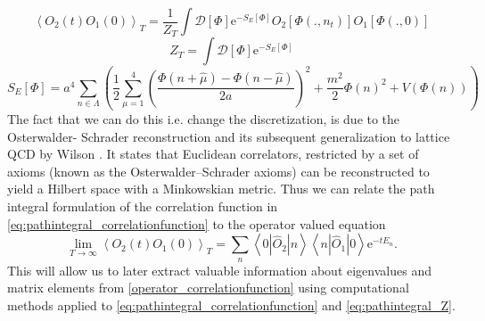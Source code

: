 \documentclass[a4paper,10pt]{book}
\begin{document}
\begin{equation}\label{eq:pathintegral_correlationfunction}
\left\langle O_{2}(t) O_{1}(0)\right\rangle_{T}=\frac{1}{Z_{T}} \int \mathcal{D}[\Phi] \mathrm{e}^{-S_{E}[\Phi]} O_{2}\left[\Phi\left(., n_{t}\right)\right] O_{1}[\Phi(., 0)]
\end{equation}
\begin{equation}\label{eq:pathintegral_Z}
Z_{T}=\int \mathcal{D}[\Phi] \mathrm{e}^{-S_{E}[\Phi]}
\end{equation}
\begin{equation}
S_{E}[\Phi]=a^{4} \sum_{n \in \Lambda}\left(\frac{1}{2} \sum_{\mu=1}^{4}\left(\frac{\Phi(n+\hat{\mu})-\Phi(n-\hat{\mu})}{2 a}\right)^{2}+\frac{m^{2}}{2} \Phi(n)^{2}+V(\Phi(n))\right)
\end{equation}
The fact that we can do this i.e. change the discretization, is due to the Osterwalder- Schrader reconstruction \cite{glimm2012quantum} and its subsequent generalization to lattice QCD by Wilson \cite{seiler1978lect}. It states that Euclidean correlators, restricted by a set of axioms (known as the Osterwalder–Schrader axioms) can be reconstructed to yield a Hilbert space with a Minkowskian metric. Thus we can relate the path integral formulation of the correlation function in \eqref{eq:pathintegral_correlationfunction} to the operator valued equation 
\begin{equation}\label{operator_correlationfunction}
\lim _{T \rightarrow \infty}\left\langle O_{2}(t) O_{1}(0)\right\rangle_{T}=\sum_{n}\left\langle 0\left|\widehat{O}_{2}\right| n\right\rangle\left\langle n\left|\widehat{O}_{1}\right| 0\right\rangle \mathrm{e}^{-t E_{n}}.
\end{equation}
This will allow us to later extract valuable information about eigenvalues and matrix elements from \eqref{operator_correlationfunction} using computational methods applied to \eqref{eq:pathintegral_correlationfunction}
and \eqref{eq:pathintegral_Z}.
\end{document}
